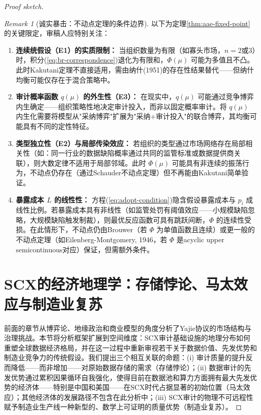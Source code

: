 \documentclass[12pt,a4paper]{ctexart}
\theoremstyle{definition}
\theoremstyle{remark}
\newtheorem{remark}{Remark}[section]
\begin{document}
\begin{proof}[Proof sketch]
\begin{remark}[诚实暴击：不动点定理的条件边界]
以下为定理\ref{thm:aae-fixed-point}的关键限定，审稿人应特别关注：
\begin{enumerate}[label=(\arabic*), leftmargin=*]
\item \textbf{连续统假设（E1）的实质限制：} 当组织数量为有限（如寡头市场，$n = 2$或$3$）时，积分(\ref{eq:br-correspondence})退化为有限和，$\Phi(\mu)$ 可能为多值且不凸。此时Kakutani定理不直接适用，需由纳什(1951)的存在性结果替代——但纳什均衡可能仅存在于混合策略中。
\item \textbf{审计概率函数 $q(\mu)$ 的外生性（E3）：} 在现实中，$q(\mu)$ 可能通过竞争博弈内生确定——组织策略性地决定审计投入，而非以固定概率审计。将 $q(\mu)$ 内生化需要将模型从"采纳博弈"扩展为"采纳+审计投入"的联合博弈，其均衡可能具有不同的定性特征。
\item \textbf{类型独立性（E2）与局部传染效应：} 若组织的类型通过市场网络存在局部相关性（如：同一行业的数据缺陷概率通过共同的监管标准或数据提供商关联），则大数定律不适用于局部邻域。此时 $\Phi(\mu)$ 可能具有非连续的振荡行为，不动点仍存在（通过Schauder不动点定理）但不再能由Kakutani简单验证。
\item \textbf{暴露成本 $L$ 的线性性：} 方程(\ref{eq:adopt-condition})隐含假设暴露成本与 $p_i$ 成线性比例。若暴露成本具有非线性（如监管处罚有阈值效应——小规模缺陷忽略，大规模缺陷触发制裁），则最优反应函数可具有跳跃间断，$\Phi$ 的连续性受损。在此情形下，不动点仍由Brouwer（若 $\Phi$ 为单值函数且连续）或更一般的不动点定理（如Eilenberg-Montgomery, 1946，若 $\Phi$ 是acyclic upper semicontinuous对应）保证，但需额外条件。
\end{enumerate}
\end{remark}

\section{SCX的经济地理学：存储悖论、马太效应与制造业复苏}

前面的章节从博弈论、地缘政治和商业模型的角度分析了Yajie协议的市场结构与治理挑战。本节将分析框架扩展到空间维度：SCX审计基础设施的地理分布如何重塑全球数据经济格局，并在这一过程中重新审视若干关于数据价值、先发优势和制造业竞争力的传统假设。我们提出三个相互关联的命题：(i) 审计质量的提升反而降低——而非增加——对原始数据存储的需求（存储悖论）；(ii) 数据审计的先发优势通过累积因果循环自我强化，使得目前在数据池和算力方面拥有最大先发优势的经济体——特别是中国和美国——在SCX时代占据显著的初始位置（马太效应）；其他经济体的发展路径不包含在此分析中；(iii) SCX审计的物理不可远程性赋予制造业生产线一种新型的、数学上可证明的质量优势（制造业复苏）。


\end{proof}
\end{document}
